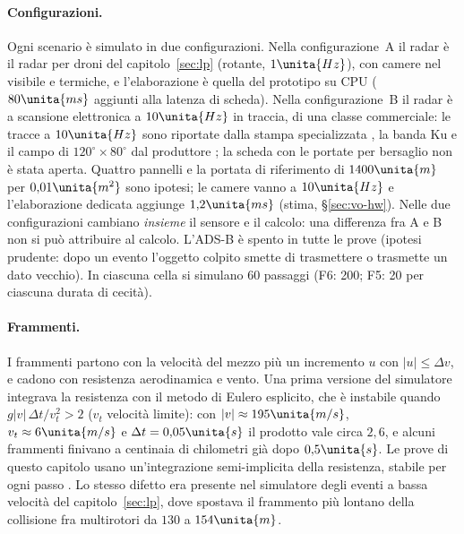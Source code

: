 \paragraph{Configurazioni.} Ogni scenario è simulato in due configurazioni. Nella configurazione~A il radar è il radar per droni del capitolo~\ref{sec:lp} (rotante, $1\unita{Hz}$), con camere nel visibile e termiche, e l'elaborazione è quella del prototipo su CPU ($80\unita{ms}$ aggiunti alla latenza di scheda). Nella configurazione~B il radar è a scansione elettronica a $10\unita{Hz}$ in traccia, di una classe commerciale: le tracce a $10\unita{Hz}$ sono riportate dalla stampa specializzata \citep{dronedj2026-echodyne}, la banda Ku e il campo di $120^\circ\times80^\circ$ dal produttore \citep{echodyne-tradegov-2024,echodyne-echoshield-news}; la scheda con le portate per bersaglio non è stata aperta. Quattro pannelli e la portata di riferimento di $1400\unita{m}$ per $0{,}01\unita{m^2}$ sono ipotesi; le camere vanno a $10\unita{Hz}$ e l'elaborazione dedicata aggiunge $1{,}2\unita{ms}$ (stima, \S\ref{sec:vo-hw}). Nelle due configurazioni cambiano \emph{insieme} il sensore e il calcolo: una differenza fra A e B non si può attribuire al calcolo. L'ADS-B è spento in tutte le prove (ipotesi prudente: dopo un evento l'oggetto colpito smette di trasmettere o trasmette un dato vecchio). In ciascuna cella si simulano 60 passaggi (F6: 200; F5: 20 per ciascuna durata di cecità).

\paragraph{Frammenti.} I frammenti partono con la velocità del mezzo più un incremento $u$ con $|u|\le\Delta v$, e cadono con resistenza aerodinamica e vento. Una prima versione del simulatore integrava la resistenza con il metodo di Eulero esplicito, che è instabile quando $g|v|\,\Delta t/v_t^2>2$ ($v_t$ velocità limite): con $|v|\approx195\unita{m/s}$, $v_t\approx6\unita{m/s}$ e $\Delta t=0{,}05\unita{s}$ il prodotto vale circa $2{,}6$, e alcuni frammenti finivano a centinaia di chilometri già dopo $0{,}5\unita{s}$. Le prove di questo capitolo usano un'integrazione semi-implicita della resistenza, stabile per ogni passo . Lo stesso difetto era presente nel simulatore degli eventi a bassa velocità del capitolo~\ref{sec:lp}, dove spostava il frammento più lontano della collisione fra multirotori da $130$ a $154\unita{m}$.

